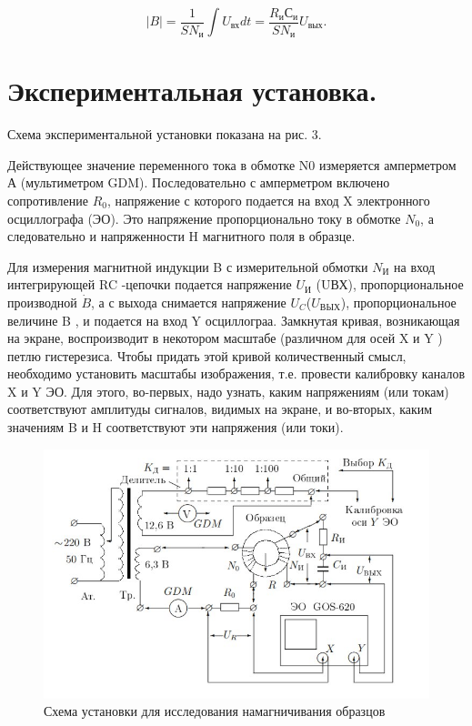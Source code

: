 \documentclass[12pt]{kiarticle} %
\begin{document}
	$$ |B|=\dfrac{1}{SN_{и}}\int U_{вх}dt=\dfrac{R_{и}С_{и}}{SN_{и}}U_{вых}.$$
	
	\section{Экспериментальная установка.}
	Схема экспериментальной установки показана на рис. 3.
	
	Действующее значение переменного тока в обмотке N0 измеряется амперметром А (мультиметром GDM). Последовательно с амперметром включено сопротивление $R_{0}$, напряжение с которого подается на вход X электронного осциллографа (ЭО). Это напряжение пропорционально току в обмотке $N_{0}$, а следовательно и напряженности H магнитного поля в образце.
	
	Для измерения магнитной индукции B с измерительной обмотки $N_{И}$ на вход интегрирующей RC -цепочки подается напряжение $U_{И}$ (UВХ), пропорциональное производной $\dot{B}$, а с выхода снимается напряжение $U_{C}$($U_{ВЫХ}$), пропорциональное
	величине B , и подается на вход Y осциллограа.
	Замкнутая кривая, возникающая на экране, воспроизводит в некотором масштабе (различном для осей X и Y ) петлю гистерезиса. Чтобы придать этой кривой количественный смысл, необходимо установить масштабы изображения, т.е. провести калибровку каналов X и Y ЭО. Для этого, во-первых, надо узнать, каким напряжениям (или токам) соответствуют амплитуды сигналов, видимых на экране, и во-вторых,  каким значениям B и H соответствуют эти напряжения
	(или токи).
	
	\begin{figure}[h!]
		\centering
		\includegraphics[width=\linewidth]{gist.jpg}
		\caption{Схема установки для исследования намагничивания образцов}
		\label{fig:Holl2}
	\end{figure}
  
\end{document}
